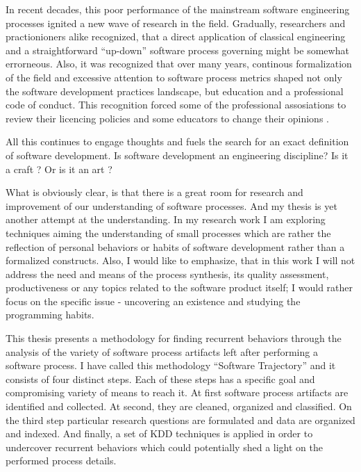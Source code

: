 In recent decades, this poor performance of the mainstream software engineering processes 
ignited a new wave of research in the field. Gradually, researchers and practionioners alike 
recognized, that a direct application of classical engineering and a straightforward ``up-down'' 
software process governing might be somewhat errorneous. Also, it was recognized that over 
many years, continous formalization of the field and excessive attention to software process 
metrics shaped not only the software development practices landscape, but education and a 
professional code of conduct. This recognition forced some of the professional assosiations 
to review their licencing policies \cite{citeulike:11045517} and some educators to change their 
opinions \cite{citeulike:5203446}. 

All this continues to engage thoughts and fuels the search for an exact definition of software 
development. Is software development an engineering discipline? Is it a craft \cite{citeulike:5203446}? 
Or is it an art \cite{citeulike:11045694}?

What is obviously clear, is that there is a great room for research and improvement of our 
understanding of software processes. And my thesis is yet another attempt at the understanding. 
In my research work I am 
exploring techniques aiming the understanding of small processes which are 
rather the reflection of personal behaviors or habits of software development rather than a 
formalized constructs. Also, I would like to emphasize, that in this work I will not 
address the need and means of the process synthesis, its quality assessment, productiveness
or any topics related to the software product itself; I would rather focus on the specific issue - 
uncovering an existence and studying the programming habits. 

This thesis presents a methodology for finding recurrent behaviors through the 
analysis of the variety of software process artifacts left after performing a 
software process. I have called this methodology ``Software Trajectory'' and it consists 
of four distinct steps. Each of these steps has a specific goal and compromising variety of 
means to reach it. 
At first software process artifacts are identified and collected. 
At second, they are cleaned, organized and classified. 
On the third step particular research questions are formulated and data are organized and indexed. 
And finally, a set of KDD techniques is applied in order to undercover recurrent behaviors which 
could potentially shed a light on the performed process details. 

